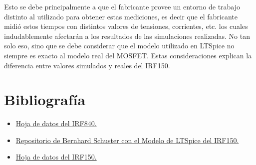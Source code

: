 \documentclass[12pt,a4paper]{article}
\begin{document}
Esto se debe principalmente a que el fabricante provee un entorno de trabajo distinto al utilizado para obtener estas mediciones, es decir que el fabricante midió estos tiempos con distintos valores de tensiones, corrientes, etc. los cuales indudablemente afectarán a los resultados de las simulaciones realizadas. No tan solo eso, sino que se debe considerar que el modelo utilizado en LTSpice no siempre es exacto al modelo real del MOSFET. Estas consideraciones explican la diferencia entre valores simulados y reales del IRF150.

\section{Bibliografía}

\begin{itemize}
    \item \href{https://www.alldatasheet.com/datasheet-pdf/view/17804/PHILIPS/IRF840.html}{Hoja de datos del IRF840.}
    \item \href{https://github.com/drahnr/oregano/blob/master/data/models/IRF150.model}{Repositorio de Bernhard Schuster con el Modelo de LTSpice del IRF150.}
    \item \href{https://www.alldatasheet.com/datasheet-pdf/view/37003/SAMSUNG/IRF150.html}{Hoja de datos del IRF150.}
\end{itemize}
\end{document}

